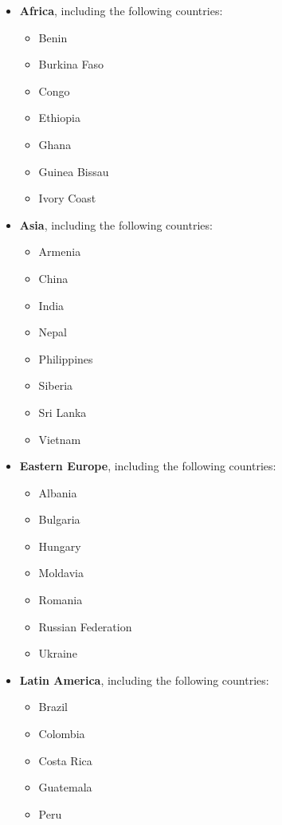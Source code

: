 \begin{itemize}
    \item \textbf{Africa}, including the following countries:
    		\begin{itemize}
    			\item Benin
    			\item Burkina Faso
    			\item Congo
    			\item Ethiopia
    			\item Ghana
    			\item Guinea Bissau
    			\item Ivory Coast
    		\end{itemize}
    \item \textbf{Asia}, including the following countries:
    		\begin{itemize}
    			\item Armenia
    			\item China
    			\item India
    			\item Nepal
    			\item Philippines
    			\item Siberia
    			\item Sri Lanka
    			\item Vietnam
    		\end{itemize}
    \item \textbf{Eastern Europe}, including the following countries:
    		\begin{itemize}
    			\item Albania
    			\item Bulgaria
    			\item Hungary
    			\item Moldavia
    			\item Romania
    			\item Russian Federation
    			\item Ukraine
    		\end{itemize}
    \item \textbf{Latin America}, including the following countries:
    		\begin{itemize}
    			\item Brazil
    			\item Colombia
    			\item Costa Rica
    			\item Guatemala
    			\item Peru
    		\end{itemize}
\end{itemize}

